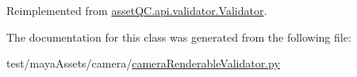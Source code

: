 \-Reimplemented from \hyperlink{classassetQC_1_1api_1_1validator_1_1Validator_a18e82948dd828a6570885e9061857c9b}{asset\-Q\-C.\-api.\-validator.\-Validator}.



\-The documentation for this class was generated from the following file\-:\begin{DoxyCompactItemize}
\item 
test/maya\-Assets/camera/\hyperlink{cameraRenderableValidator_8py}{camera\-Renderable\-Validator.\-py}\end{DoxyCompactItemize}
